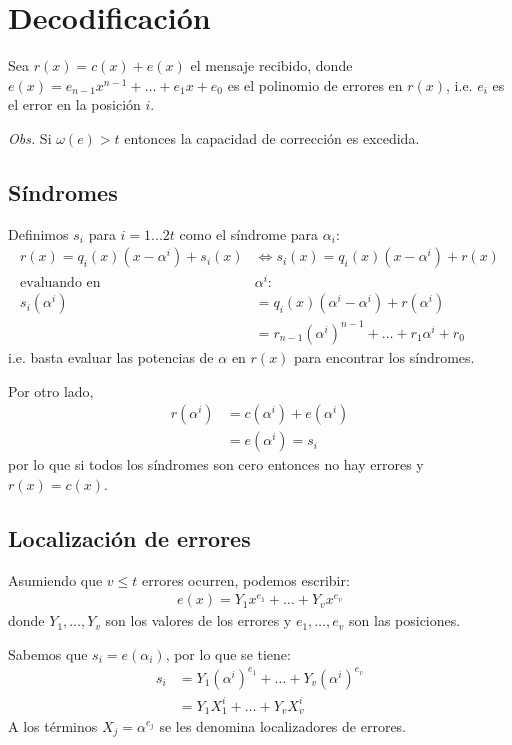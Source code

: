 \documentclass[12pt]{article}
\begin{document}
\section{Decodificación}
Sea $r(x) = c(x) + e(x)$ el mensaje recibido, donde $e(x) = e_{n-1} x^{n-1} + \ldots + e_1 x + e_0$ es el polinomio de errores en $r(x)$, i.e. $e_i$ es el error en la posición $i$.

\textit{Obs.} Si $\omega (e) > t$ entonces la capacidad de corrección es excedida.

\subsection{Síndromes}
Definimos $s_i$ para $i = 1...2t$ como el síndrome para $\alpha_i$:
\begin{align*}
r(x) = q_i(x)(x - \alpha^i) + s_i(x)
&\Leftrightarrow
s_i(x) = q_i(x)(x - \alpha^i) + r(x)
\\\text{evaluando en } & \alpha^i:
\\s_i(\alpha^i) &= q_i(x)(\alpha^i - \alpha^i) + r(\alpha^i)
\\&= r_{n-1}(\alpha^i)^{n-1} + \ldots + r_1 \alpha^i + r_0
\end{align*}
i.e. basta evaluar las potencias de $\alpha$ en $r(x)$ para encontrar los síndromes.

Por otro lado,
\begin{align*}
r(\alpha^i) &= c(\alpha^i) + e(\alpha^i)
\\ &= e(\alpha^i) = s_i
\end{align*}
por lo que si todos los síndromes son cero entonces no hay errores y $r(x) = c(x)$.

\subsection{Localización de errores}
Asumiendo que $v \leq t$ errores ocurren, podemos escribir:
\begin{align*}
e(x) = Y_1 x^{e_1} + \ldots + Y_v x^{e_v}
\end{align*}
donde $Y_1, \ldots , Y_v$ son los valores de los errores y $e_1, \ldots , e_v$ son las posiciones.

Sabemos que $s_i = e(\alpha_i)$, por lo que se tiene:
\begin{align*}
s_i &= Y_1 (\alpha^i)^{e_1} + \ldots + Y_v (\alpha^i)^{e_v}
\\ &= Y_1 X_1^i + \ldots + Y_v X_v^i
\end{align*}
A los términos $X_j = \alpha^{e_j}$ se les denomina localizadores de errores.
\end{document}
